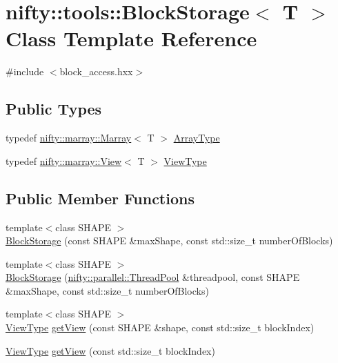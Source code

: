 \hypertarget{classnifty_1_1tools_1_1BlockStorage}{}\section{nifty\+:\+:tools\+:\+:Block\+Storage$<$ T $>$ Class Template Reference}
\label{classnifty_1_1tools_1_1BlockStorage}


{\ttfamily \#include $<$block\+\_\+access.\+hxx$>$}

\subsection*{Public Types}
\begin{DoxyCompactItemize}
\item 
typedef \hyperlink{classandres_1_1Marray}{nifty\+::marray\+::\+Marray}$<$ T $>$ \hyperlink{classnifty_1_1tools_1_1BlockStorage_af39a2936478b64389c56a5c6ef5aab7d}{Array\+Type}
\item 
typedef \hyperlink{classandres_1_1View}{nifty\+::marray\+::\+View}$<$ T $>$ \hyperlink{classnifty_1_1tools_1_1BlockStorage_afe259433c35f56d01be0b597a696e090}{View\+Type}
\end{DoxyCompactItemize}
\subsection*{Public Member Functions}
\begin{DoxyCompactItemize}
\item 
{\footnotesize template$<$class S\+H\+A\+P\+E $>$ }\\\hyperlink{classnifty_1_1tools_1_1BlockStorage_a95d95c49b1a1ed51c6d794d3fe8f2645}{Block\+Storage} (const S\+H\+A\+P\+E \&max\+Shape, const std\+::size\+\_\+t number\+Of\+Blocks)
\item 
{\footnotesize template$<$class S\+H\+A\+P\+E $>$ }\\\hyperlink{classnifty_1_1tools_1_1BlockStorage_a536abc42caab3d50becdfbadd2d58f89}{Block\+Storage} (\hyperlink{classnifty_1_1parallel_1_1ThreadPool}{nifty\+::parallel\+::\+Thread\+Pool} \&threadpool, const S\+H\+A\+P\+E \&max\+Shape, const std\+::size\+\_\+t number\+Of\+Blocks)
\item 
{\footnotesize template$<$class S\+H\+A\+P\+E $>$ }\\\hyperlink{classnifty_1_1tools_1_1BlockStorage_afe259433c35f56d01be0b597a696e090}{View\+Type} \hyperlink{classnifty_1_1tools_1_1BlockStorage_ae9f1e8b14c9281036350c8e6022c5ec0}{get\+View} (const S\+H\+A\+P\+E \&shape, const std\+::size\+\_\+t block\+Index)
\item 
\hyperlink{classnifty_1_1tools_1_1BlockStorage_afe259433c35f56d01be0b597a696e090}{View\+Type} \hyperlink{classnifty_1_1tools_1_1BlockStorage_a03263a4946397ebea215101c8e53bc24}{get\+View} (const std\+::size\+\_\+t block\+Index)
\end{DoxyCompactItemize}


